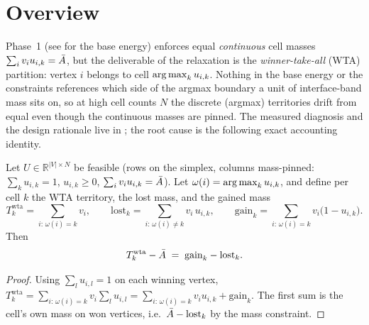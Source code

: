 \documentclass[11pt,a4paper]{article}
\begin{document}
\tableofcontents
\newpage

\section{Overview}
\label{sec:overview}

Phase~1 (see  for the
base energy) enforces equal \emph{continuous} cell masses
$\sum_i v_i u_{i,k} = \bar{A}$, but the deliverable of the relaxation is the
\emph{winner-take-all} (WTA) partition: vertex $i$ belongs to cell
$\operatorname*{arg\,max}_k u_{i,k}$. Nothing in the base energy or the constraints references
which side of the argmax boundary a unit of interface-band mass sits on, so at
high cell counts $N$ the discrete (argmax) territories drift from equal even
though the continuous masses are pinned. The measured diagnosis and the design
rationale live in ; the
root cause is the following exact accounting identity.

\begin{prop}
\label{prop:identity}
Let $U\in\mathbb{R}^{|V|\times N}$ be feasible (rows on the simplex, columns
mass-pinned: $\sum_k u_{i,k}=1$, $u_{i,k}\ge 0$, $\sum_i v_i u_{i,k}=\bar{A}$).
Let $\omega(i)=\operatorname*{arg\,max}_k u_{i,k}$, and define per cell $k$ the WTA territory,
the lost mass, and the gained mass
\[
  T^{\mathrm{wta}}_k = \sum_{i:\,\omega(i)=k} v_i,
  \qquad
  \mathrm{lost}_k = \sum_{i:\,\omega(i)\neq k} v_i\, u_{i,k},
  \qquad
  \mathrm{gain}_k = \sum_{i:\,\omega(i)=k} v_i \bigl(1 - u_{i,k}\bigr).
\]
Then
\begin{equation}
  T^{\mathrm{wta}}_k - \bar{A} \;=\; \mathrm{gain}_k - \mathrm{lost}_k .
  \label{eq:identity}
\end{equation}
\end{prop}

\begin{proof}
Using $\sum_l u_{i,l}=1$ on each winning vertex,
$T^{\mathrm{wta}}_k
 = \sum_{i:\,\omega(i)=k} v_i \sum_l u_{i,l}
 = \sum_{i:\,\omega(i)=k} v_i u_{i,k} + \mathrm{gain}_k$.
The first sum is the cell's own mass on won vertices, i.e.\
$\bar{A} - \mathrm{lost}_k$ by the mass constraint.
\end{proof}
\end{document}
